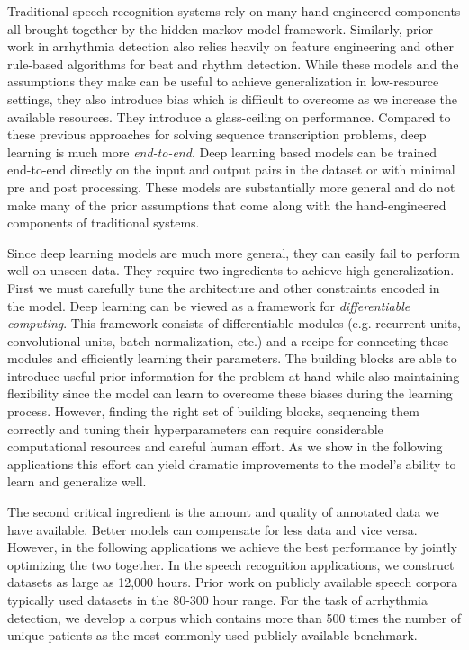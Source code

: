 Traditional speech recognition systems rely on many hand-engineered components
all brought together by the hidden markov model framework. Similarly, prior
work in arrhythmia detection also relies heavily on feature engineering and
other rule-based algorithms for beat and rhythm detection. While these models
and the assumptions they make can be useful to achieve generalization in
low-resource settings, they also introduce bias which is difficult to overcome
as we increase the available resources. They introduce a glass-ceiling on
performance.  Compared to these previous approaches for solving sequence
transcription problems, deep learning is much more {\it end-to-end}. Deep
learning based models can be trained end-to-end directly on the input and
output pairs in the dataset or with minimal pre and post processing. These
models are substantially more general and do not make many of the prior
assumptions that come along with the hand-engineered components of traditional
systems.

Since deep learning models are much more general, they can easily fail to
perform well on unseen data. They require two ingredients to achieve high
generalization. First we must carefully tune the architecture and other
constraints encoded in the model. Deep learning can be viewed as a framework
for {\it differentiable computing}. This framework consists of differentiable
modules (e.g. recurrent units, convolutional units, batch normalization, etc.)
and a recipe for connecting these modules and efficiently learning their
parameters.  The building blocks are able to introduce useful prior information
for the problem at hand while also maintaining flexibility since the model can
learn to overcome these biases during the learning process. However, finding
the right set of building blocks, sequencing them correctly and tuning their
hyperparameters can require considerable computational resources and careful
human effort. As we show in the following applications this effort can yield
dramatic improvements to the model's ability to learn and generalize well.

The second critical ingredient is the amount and quality of annotated data we
have available. Better models can compensate for less data and vice versa.
However, in the following applications we achieve the best performance by
jointly optimizing the two together. In the speech recognition applications, we
construct datasets as large as 12,000 hours. Prior work on publicly available
speech corpora typically used datasets in the 80-300 hour range. For the task
of arrhythmia detection, we develop a corpus which contains more than 500 times
the number of unique patients as the most commonly used publicly available
benchmark.

